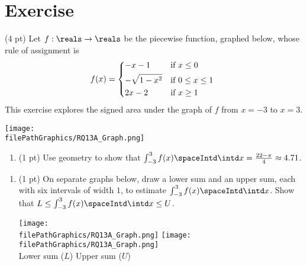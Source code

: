 %
%
%
%

\section{Exercise}


(4 pt) Let $f : \reals \rightarrow \reals$ be the piecewise function, graphed below, whose rule of assignment is
\begin{align*}
f(x)
=
\begin{dcases*}
-x - 1			&	if $x \leq 0$		\\
-\sqrt{1 - x^{2}}	&	if $0 \leq x \leq 1$	\\
2 x - 2		&	if $x \geq 1$
\end{dcases*}
\end{align*}
This exercise explores the signed area under the graph of $f$ from $x = -3$ to $x = 3$.
\begin{center}
\texttt{[image: \\filePathGraphics/RQ13A\_Graph.png]}%
\end{center}



\begin{enumerate}[label=(\alph*)]
\item\label{itm : RQ13Aa} (1 pt) Use geometry to show that $\int_{-3}^{3} f(x) \spaceIntd \intd x = \frac{22 - \pi}{4} \approx 4.71$.
\end{enumerate}

\spaceSolution{1in}{%
}%



\begin{enumerate}[resume,label=(\alph*)]
\item\label{itm : RQ13Ab} (1 pt) On separate graphs below, draw a lower sum and an upper sum, each with six intervals of width $1$, to estimate $\int_{-3}^{3} f(x) \spaceIntd \intd x$. Show that $L \leq \int_{-3}^{3} f(x) \spaceIntd \intd x \leq U$.
\begin{center}
\texttt{[image: \\filePathGraphics/RQ13A\_Graph.png]}%
\hspace{1in}
\texttt{[image: \\filePathGraphics/RQ13A\_Graph.png]}%
\\
Lower sum ($L$)
\hspace{2.3in}
Upper sum ($U$)
\end{center}
\end{enumerate}


